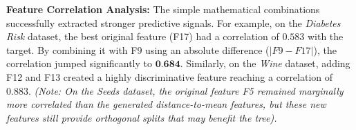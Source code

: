 \documentclass[11pt,a4paper]{article}
\begin{document}
\begin{table}[htbp]
\centering
\caption{Feature Engineering Results: Original vs. Top 3 Generated Features}
\end{table}
\textbf{Feature Correlation Analysis:}
The simple mathematical combinations successfully extracted stronger predictive signals. For example, on the \textit{Diabetes Risk} dataset, the best original feature (F17) had a correlation of $0.583$ with the target. By combining it with F9 using an absolute difference ($|F9 - F17|$), the correlation jumped significantly to $\textbf{0.684}$. Similarly, on the \textit{Wine} dataset, adding F12 and F13 created a highly discriminative feature reaching a correlation of $0.883$. 
\textit{(Note: On the Seeds dataset, the original feature F5 remained marginally more correlated than the generated distance-to-mean features, but these new features still provide orthogonal splits that may benefit the tree).}
\end{document}
